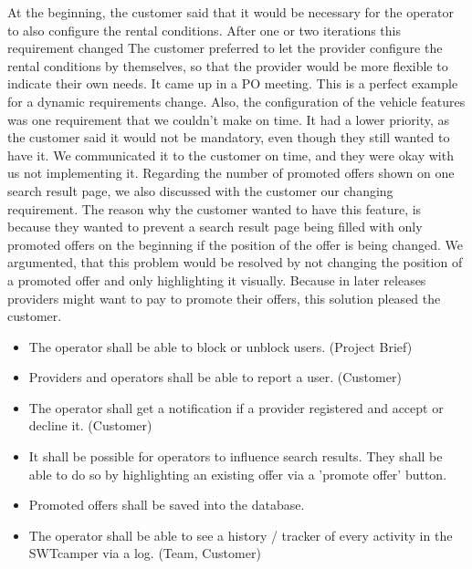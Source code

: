 At the beginning, the customer said that it would be necessary for the operator to also configure the rental conditions.
After one or two iterations this requirement changed
The customer preferred to let the provider configure the rental conditions by themselves, so that the provider would be more flexible to indicate their own needs.
It came up in a PO meeting.
This is a perfect example for a dynamic requirements change.
Also, the configuration of the vehicle features was one requirement that we couldn't make on time.
It had a lower priority, as the customer said it would not be mandatory, even though they still wanted to have it.
We communicated it to the customer on time, and they were okay with us not implementing it.
Regarding the number of promoted offers shown on one search result page, we also discussed with the customer our changing requirement.
The reason why the customer wanted to have this feature, is because they wanted to prevent a search result page being filled with only promoted offers on the beginning if the position of the offer is being changed.
We argumented, that this problem would be resolved by not changing the position of a promoted offer and only highlighting it visually.
Because in later releases providers might want to pay to promote their offers, this solution pleased the customer.


\begin{itemize}
    \item The operator shall be able to block or unblock users. (Project Brief)
    \item Providers and operators shall be able to report a user. (Customer)
    \item The operator shall get a notification if a provider registered and accept or decline it. (Customer)
    \item It shall be possible for operators to influence search results. They shall be able to do so by highlighting an existing offer via a 'promote offer' button.
    \item Promoted offers shall be saved into the database.
    \item The operator shall be able to see a history / tracker of every activity in the SWTcamper via a log. (Team, Customer)
\end{itemize}


